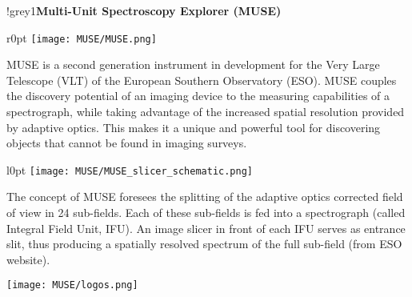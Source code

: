 \begin{gbox}{{\LARGE !}}{grey1}{{\large \textbf{Multi-Unit Spectroscopy Explorer
      (MUSE)}}}
  \begin{minipage}{\linewidth}
    \begin{wrapfigure}{r}{0pt}
      \texttt{[image: MUSE/MUSE.png]}
    \end{wrapfigure}
    \strut {\small MUSE is a second
      generation instrument in development for the Very Large Telescope (VLT) of
      the European Southern Observatory (ESO). MUSE couples the
      discovery potential of an imaging device to the measuring capabilities of
      a spectrograph, while taking advantage of the increased spatial resolution
      provided by adaptive optics. This makes it a unique and powerful tool for
      discovering objects that cannot be found in imaging surveys.}
  \end{minipage}

  \begin{minipage}{\linewidth}
    \begin{wrapfigure}{l}{0pt}
      \texttt{[image: MUSE/MUSE\_slicer\_schematic.png]}
    \end{wrapfigure}
    \strut {\small The concept of MUSE foresees the splitting of the adaptive
      optics corrected field of view in 24 sub-fields. Each of these sub-fields
      is fed into a spectrograph (called Integral Field Unit, IFU). An image
      slicer in front of each IFU serves as entrance slit, thus producing a
      spatially resolved spectrum of the full sub-field (from ESO
      website).}
  \end{minipage}

  \vspace{2cm}

  \begin{minipage}{\linewidth}
    \begin{center}
      \texttt{[image: MUSE/logos.png]}
    \end{center}
  \end{minipage}
\end{gbox}